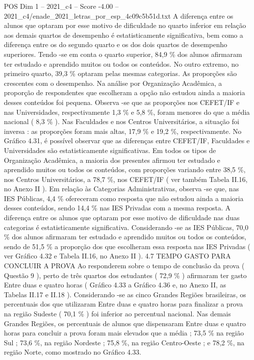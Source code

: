 \begin{textsample}{POS Dim 1 – 2021\_c4 – Score -4.00 – 2021\_c4/enade\_2021\_letras\_por\_esp\_4c09c5b51d.txt}
A diferença entre os alunos que optaram por esse motivo de dificuldade no quarto inferior em relação aos demais quartos de desempenho é estatisticamente significativa, bem como a diferença entre os do segundo quarto e os dos dois quartos de desempenho superiores.
Tendo -se em conta o quarto superior, 84,9 \% dos alunos afirmaram ter estudado e aprendido muitos ou todos os conteúdos.
No outro extremo, no primeiro quarto, 39,3 \% optaram pelas mesmas categorias.
As proporções são crescentes com o desempenho.
Na análise por Organização Acadêmica, a proporção de respondentes que escolheram a opção não estudou ainda a maioria desses conteúdos foi pequena.
Observa -se que as proporções nos CEFET/IF e nas Universidades, respectivamente 1,3 \% e 5,8 \%, foram menores do que a média nacional ( 8,3 \% ).
Nas Faculdades e nos Centros Universitários, a situação foi inversa : as proporções foram mais altas, 17,9 \% e 19,2 \%, respectivamente.
No Gráfico 4.31, é possível observar que as diferenças entre CEFET/IF, Faculdades e Universidades são estatisticamente significativas.
Em todos os tipos de Organização Acadêmica, a maioria dos presentes afirmou ter estudado e aprendido muitos ou todos os conteúdos, com proporções variando entre 38,5 \%, nos Centros Universitários, a 78,7 \%, nos CEFET/IF ( ver também Tabela II.16, no Anexo II ).
Em relação às Categorias Administrativas, observa -se que, nas IES Públicas, 4,4 \% ofereceram como resposta que não estudou ainda a maioria desses conteúdos, sendo 14,4 \% nas IES Privadas com a mesma resposta.
A diferença entre os alunos que optaram por esse motivo de dificuldade nas duas categorias é estatisticamente significativa.
Considerando -se as IES Públicas, 70,0 \% dos alunos afirmaram ter estudado e aprendido muitos ou todos os conteúdos, sendo de 51,5 \% a proporção dos que escolheram essa resposta nas IES Privadas ( ver Gráfico 4.32 e Tabela II.16, no Anexo II ). 4.7 TEMPO GASTO PARA CONCLUIR A PROVA Ao responderem sobre o tempo de conclusão da prova ( Questão 9 ), perto de três quartos dos estudantes ( 72,9 \% ) afirmaram ter gasto Entre duas e quatro horas ( Gráfico 4.33 a Gráfico 4.36 e, no Anexo II, as Tabelas II.17 e II.18 ).
Considerando -se as cinco Grandes Regiões brasileiras, os percentuais dos que utilizaram Entre duas e quatro horas para finalizar a prova na região Sudeste ( 70,1 \% ) foi inferior ao percentual nacional.
Nas demais Grandes Regiões, os percentuais de alunos que dispensaram Entre duas e quatro horas para concluir a prova foram mais elevados que a média ; 73,5 \% na região Sul ; 73,6 \%, na região Nordeste ; 75,8 \%, na região Centro-Oeste ; e 78,2 \%, na região Norte, como mostrado no Gráfico 4.33.

\end{textsample}
